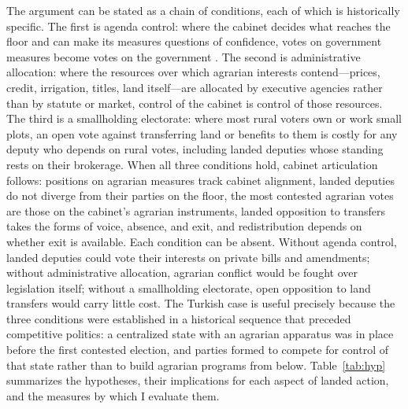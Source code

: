 \documentclass[12pt]{article}
\begin{document}
The argument can be stated as a chain of conditions, each of which is historically specific. The first is agenda control: where the cabinet decides what reaches the floor and can make its measures questions of confidence, votes on government measures become votes on the government \citep{cox1987,huber1996}. The second is administrative allocation: where the resources over which agrarian interests contend---prices, credit, irrigation, titles, land itself---are allocated by executive agencies rather than by statute or market, control of the cabinet is control of those resources. The third is a smallholding electorate: where most rural voters own or work small plots, an open vote against transferring land or benefits to them is costly for any deputy who depends on rural votes, including landed deputies whose standing rests on their brokerage. When all three conditions hold, cabinet articulation follows: positions on agrarian measures track cabinet alignment, landed deputies do not diverge from their parties on the floor, the most contested agrarian votes are those on the cabinet's agrarian instruments, landed opposition to transfers takes the forms of voice, absence, and exit, and redistribution depends on whether exit is available. Each condition can be absent. Without agenda control, landed deputies could vote their interests on private bills and amendments; without administrative allocation, agrarian conflict would be fought over legislation itself; without a smallholding electorate, open opposition to land transfers would carry little cost. The Turkish case is useful precisely because the three conditions were established in a historical sequence that preceded competitive politics: a centralized state with an agrarian apparatus was in place before the first contested election, and parties formed to compete for control of that state rather than to build agrarian programs from below. Table~\ref{tab:hyp} summarizes the hypotheses, their implications for each aspect of landed action, and the measures by which I evaluate them.
\end{document}

